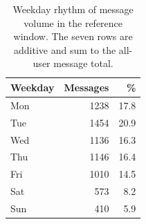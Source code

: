 \begin{table}[htbp]
\centering
\caption{Weekday rhythm of message volume in the reference window. The seven rows are additive and sum to the all-user message total.}
\label{tab:s5-weekday}
\begin{tabular}{lrr}
\toprule
Weekday & Messages & \% \\
\midrule
Mon & 1238 & 17.8 \\
Tue & 1454 & 20.9 \\
Wed & 1136 & 16.3 \\
Thu & 1146 & 16.4 \\
Fri & 1010 & 14.5 \\
Sat & 573 & 8.2 \\
Sun & 410 & 5.9 \\
\bottomrule
\end{tabular}
\par{}
\end{table}
